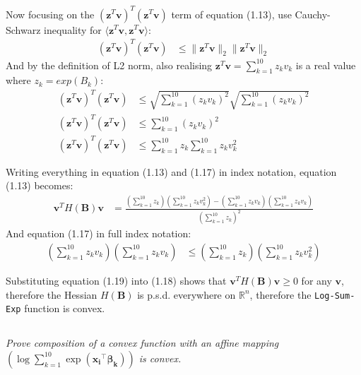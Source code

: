 \documentclass[12pt]{article}
\numberwithin{equation}{section}
\theoremstyle{remark}
\newcommand{\R}{\mathbb R} %
\newcommand{\vect}[1]{\boldsymbol{#1}}
\newcommand{\norm}[2]{\|#1\|_{#2}}
\begin{document}
\medskip
Now focusing on the $\left(\vect{z}^{T}\vect{v}\right)^{T}\left(\vect{z}^{T}\vect{v}\right)$ term of equation (1.13), use Cauchy-Schwarz inequality for $\langle \vect{z}^{T}\vect{v}, \vect{z}^{T}\vect{v}\rangle$:
\begin{align}
\left(\vect{z}^{T}\vect{v}\right)^{T}\left(\vect{z}^{T}\vect{v}\right) &\leq \norm{\vect{z}^{T}\vect{v}}{2}\norm{\vect{z}^{T}\vect{v}}{2}
\end{align}
And by the definition of L2 norm, also realising $\vect{z}^{T}\vect{v} = \sum\limits_{k = 1}^{10}z_{k}v_{k}$ is a real value where $z_{k} = exp(B_{k})$:
\begin{align}
\left(\vect{z}^{T}\vect{v}\right)^{T}\left(\vect{z}^{T}\vect{v}\right) &\leq \sqrt{\sum\limits_{k = 1}^{10}\left(z_{k}v_{k}\right)^{2}}\sqrt{\sum\limits_{k = 1}^{10}\left(z_{k}v_{k}\right)^{2}} \\
\left(\vect{z}^{T}\vect{v}\right)^{T}\left(\vect{z}^{T}\vect{v}\right) &\leq \sum\limits_{k = 1}^{10}\left(z_{k}v_{k}\right)^{2} \\
\left(\vect{z}^{T}\vect{v}\right)^{T}\left(\vect{z}^{T}\vect{v}\right) &\leq \sum\limits_{k = 1}^{10}z_{k}\sum\limits_{k = 1}^{10}z_{k}v_{k}^{2}
\end{align}

\medskip
Writing everything in equation (1.13) and (1.17) in index notation, equation (1.13) becomes:
\begin{align}
\vect{v}^{T}H(\vect{B})\vect{v} &= \frac{\left(\sum\limits_{k = 1}^{10}z_{k}\right)\left(\sum\limits_{k = 1}^{10}z_{k}v_{k}^{2}\right) - \left(\sum\limits_{k = 1}^{10}z_{k}v_{k}\right)\left(\sum\limits_{k = 1}^{10}z_{k}v_{k}\right)}{\left(\sum\limits_{k = 1}^{10}z_{k}\right)^{2}}
\end{align}
And equation (1.17) in full index notation:
\begin{align}
\left(\sum\limits_{k = 1}^{10}z_{k}v_{k}\right)\left(\sum\limits_{k = 1}^{10}z_{k}v_{k}\right) &\leq \left(\sum\limits_{k = 1}^{10}z_{k}\right)\left(\sum\limits_{k = 1}^{10}z_{k}v_{k}^{2}\right)
\end{align}

\medskip
Substituting equation (1.19) into (1.18) shows that $\vect{v}^{T}H(\vect{B})\vect{v} \geq 0$ for any $\vect{v}$, therefore the Hessian $H(\vect{B})$ is p.s.d. everywhere on $\R^{n}$, therefore the \texttt{Log-Sum-Exp} function is convex.

\subsection{}
\textit{Prove composition of a convex function with an affine mapping $\left( \log \sum\limits_{k = 1}^{10} \exp \left( \vect{x_i}^{\top} \vect{\beta_k} \right) \right)$ is convex.}
\end{document}

